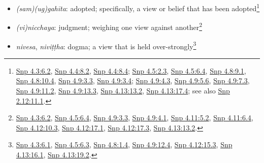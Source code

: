 \documentclass[12pt,openany]{book}%
\begin{document}
\begin{itemize}
\item \textit{(sam)(ug)\textsanskrit{gahīta}}: adopted; specifically, a view or belief that has been adopted\footnote{\href{https://suttacentral.net/snp4.3/en/sujato\#6.2}{Snp 4.3:6.2}, \href{https://suttacentral.net/snp4.4/en/sujato\#8.2}{Snp 4.4:8.2}, \href{https://suttacentral.net/snp4.4/en/sujato\#8.4}{Snp 4.4:8.4}; \href{https://suttacentral.net/snp4.5/en/sujato\#2.3}{Snp 4.5:2.3}, \href{https://suttacentral.net/snp4.5/en/sujato\#6.4}{Snp 4.5:6.4}, \href{https://suttacentral.net/snp4.8/en/sujato\#9.1}{Snp 4.8:9.1}, \href{https://suttacentral.net/snp4.8/en/sujato\#10.4}{Snp 4.8:10.4}, \href{https://suttacentral.net/snp4.9/en/sujato\#3.3}{Snp 4.9:3.3}, \href{https://suttacentral.net/snp4.9/en/sujato\#3.4}{Snp 4.9:3.4}; \href{https://suttacentral.net/snp4.9/en/sujato\#4.3}{Snp 4.9:4.3}, \href{https://suttacentral.net/snp4.9/en/sujato\#5.6}{Snp 4.9:5.6}, \href{https://suttacentral.net/snp4.9/en/sujato\#7.3}{Snp 4.9:7.3}, \href{https://suttacentral.net/snp4.9/en/sujato\#11.2}{Snp 4.9:11.2}, \href{https://suttacentral.net/snp4.9/en/sujato\#13.3}{Snp 4.9:13.3}, \href{https://suttacentral.net/snp4.13/en/sujato\#13.2}{Snp 4.13:13.2}, \href{https://suttacentral.net/snp4.13/en/sujato\#17.4}{Snp 4.13:17.4}; see also \href{https://suttacentral.net/snp2.12/en/sujato\#11.1}{Snp 2.12:11.1}. }%
\item \textit{(vi)nicchaya}: judgment; weighing one view against another\footnote{\href{https://suttacentral.net/snp4.3/en/sujato\#6.2}{Snp 4.3:6.2}, \href{https://suttacentral.net/snp4.5/en/sujato\#6.4}{Snp 4.5:6.4}, \href{https://suttacentral.net/snp4.9/en/sujato\#3.3}{Snp 4.9:3.3}, \href{https://suttacentral.net/snp4.9/en/sujato\#4.1}{Snp 4.9:4.1}, \href{https://suttacentral.net/snp4.11/en/sujato\#5.2}{Snp 4.11:5.2}, \href{https://suttacentral.net/snp4.11/en/sujato\#6.4}{Snp 4.11:6.4}, \href{https://suttacentral.net/snp4.12/en/sujato\#10.3}{Snp 4.12:10.3}, \href{https://suttacentral.net/snp4.12/en/sujato\#17.1}{Snp 4.12:17.1}, \href{https://suttacentral.net/snp4.12/en/sujato\#17.3}{Snp 4.12:17.3}, \href{https://suttacentral.net/snp4.13/en/sujato\#13.2}{Snp 4.13:13.2}. }%
\item \textit{nivesa}, \textit{\textsanskrit{niviṭṭha}}: dogma; a view that is held over-strongly\footnote{\href{https://suttacentral.net/snp4.3/en/sujato\#6.1}{Snp 4.3:6.1}, \href{https://suttacentral.net/snp4.5/en/sujato\#6.3}{Snp 4.5:6.3}, \href{https://suttacentral.net/snp4.8/en/sujato\#1.4}{Snp 4.8:1.4}, \href{https://suttacentral.net/snp4.9/en/sujato\#12.4}{Snp 4.9:12.4}, \href{https://suttacentral.net/snp4.12/en/sujato\#15.3}{Snp 4.12:15.3}, \href{https://suttacentral.net/snp4.13/en/sujato\#16.1}{Snp 4.13:16.1}, \href{https://suttacentral.net/snp4.13/en/sujato\#19.2}{Snp 4.13:19.2}. }%

\end{itemize}
\end{document}
